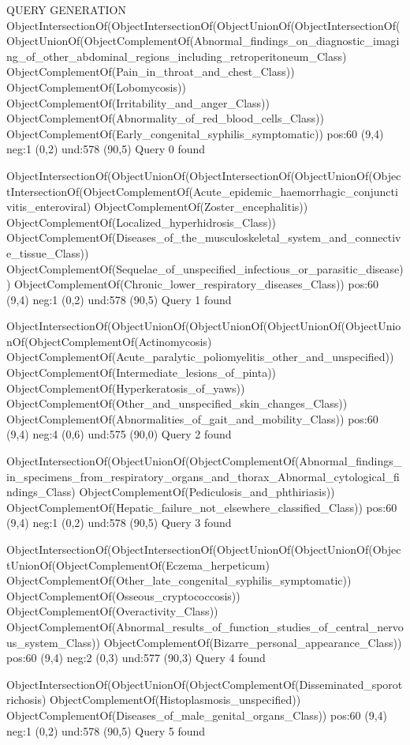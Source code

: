 QUERY GENERATION
ObjectIntersectionOf(ObjectIntersectionOf(ObjectUnionOf(ObjectIntersectionOf(ObjectUnionOf(ObjectComplementOf(Abnormal_findings_on_diagnostic_imaging_of_other_abdominal_regions_including_retroperitoneum_Class) ObjectComplementOf(Pain_in_throat_and_chest_Class)) ObjectComplementOf(Lobomycosis)) ObjectComplementOf(Irritability_and_anger_Class)) ObjectComplementOf(Abnormality_of_red_blood_cells_Class)) ObjectComplementOf(Early_congenital_syphilis_symptomatic))
pos:60 (9,4)		 neg:1 (0,2)		 und:578 (90,5)
Query 0 found

ObjectIntersectionOf(ObjectUnionOf(ObjectIntersectionOf(ObjectUnionOf(ObjectIntersectionOf(ObjectComplementOf(Acute_epidemic_haemorrhagic_conjunctivitis_enteroviral) ObjectComplementOf(Zoster_encephalitis)) ObjectComplementOf(Localized_hyperhidrosis_Class)) ObjectComplementOf(Diseases_of_the_musculoskeletal_system_and_connective_tissue_Class)) ObjectComplementOf(Sequelae_of_unspecified_infectious_or_parasitic_disease)) ObjectComplementOf(Chronic_lower_respiratory_diseases_Class))
pos:60 (9,4)		 neg:1 (0,2)		 und:578 (90,5)
Query 1 found

ObjectIntersectionOf(ObjectUnionOf(ObjectUnionOf(ObjectUnionOf(ObjectUnionOf(ObjectComplementOf(Actinomycosis) ObjectComplementOf(Acute_paralytic_poliomyelitis_other_and_unspecified)) ObjectComplementOf(Intermediate_lesions_of_pinta)) ObjectComplementOf(Hyperkeratosis_of_yaws)) ObjectComplementOf(Other_and_unspecified_skin_changes_Class)) ObjectComplementOf(Abnormalities_of_gait_and_mobility_Class))
pos:60 (9,4)		 neg:4 (0,6)		 und:575 (90,0)
Query 2 found

ObjectIntersectionOf(ObjectUnionOf(ObjectComplementOf(Abnormal_findings_in_specimens_from_respiratory_organs_and_thorax_Abnormal_cytological_findings_Class) ObjectComplementOf(Pediculosis_and_phthiriasis)) ObjectComplementOf(Hepatic_failure_not_elsewhere_classified_Class))
pos:60 (9,4)		 neg:1 (0,2)		 und:578 (90,5)
Query 3 found

ObjectIntersectionOf(ObjectIntersectionOf(ObjectUnionOf(ObjectUnionOf(ObjectUnionOf(ObjectComplementOf(Eczema_herpeticum) ObjectComplementOf(Other_late_congenital_syphilis_symptomatic)) ObjectComplementOf(Osseous_cryptococcosis)) ObjectComplementOf(Overactivity_Class)) ObjectComplementOf(Abnormal_results_of_function_studies_of_central_nervous_system_Class)) ObjectComplementOf(Bizarre_personal_appearance_Class))
pos:60 (9,4)		 neg:2 (0,3)		 und:577 (90,3)
Query 4 found

ObjectIntersectionOf(ObjectUnionOf(ObjectComplementOf(Disseminated_sporotrichosis) ObjectComplementOf(Histoplasmosis_unspecified)) ObjectComplementOf(Diseases_of_male_genital_organs_Class))
pos:60 (9,4)		 neg:1 (0,2)		 und:578 (90,5)
Query 5 found

